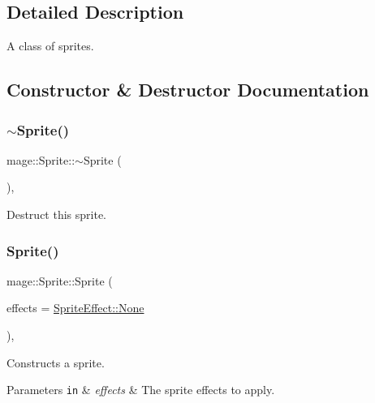 \subsection{Detailed Description}
A class of sprites. 

\subsection{Constructor \& Destructor Documentation}
\hypertarget{classmage_1_1_sprite_a0f184574f9c035d6fbb239c1868aa670}{}\label{classmage_1_1_sprite_a0f184574f9c035d6fbb239c1868aa670} 
\subsubsection{\texorpdfstring{$\sim$\+Sprite()}{~Sprite()}}
{\footnotesize\ttfamily mage\+::\+Sprite\+::$\sim$\+Sprite (\begin{DoxyParamCaption}{ }\end{DoxyParamCaption})\hspace{0.3cm}{\ttfamily [virtual]}, {\ttfamily [default]}}

Destruct this sprite. \hypertarget{classmage_1_1_sprite_a4e7926b7fd1455afcb95e45f25b83246}{}\label{classmage_1_1_sprite_a4e7926b7fd1455afcb95e45f25b83246} 
\subsubsection{\texorpdfstring{Sprite()}{Sprite()}\hspace{0.1cm}{\footnotesize\ttfamily [1/3]}}
{\footnotesize\ttfamily mage\+::\+Sprite\+::\+Sprite (\begin{DoxyParamCaption}\item[{\hyperlink{namespacemage_a9cfe18123066ba4236f548f9de75d881}{Sprite\+Effect}}]{effects = {\ttfamily \hyperlink{namespacemage_a5e7e18b0154373ce8fc942fe3f6b27fda6adf97f83acf6453d4a6a4b1070f3754}{Sprite\+Effect\+::\+None}} }\end{DoxyParamCaption})\hspace{0.3cm}{\ttfamily [explicit]}, {\ttfamily [protected]}}

Constructs a sprite.


\begin{DoxyParams}[1]{Parameters}
\mbox{\tt in}  & {\em effects} & The sprite effects to apply. \\
\hline
\end{DoxyParams}
\hypertarget{classmage_1_1_sprite_a9c1eb4f5a85e1fa17479012dd22114a9}{}\label{classmage_1_1_sprite_a9c1eb4f5a85e1fa17479012dd22114a9} 

